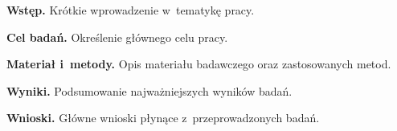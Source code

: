 
\textbf{Wstęp.}
Krótkie wprowadzenie w~tematykę pracy.

\textbf{Cel badań.}
Określenie głównego celu pracy.

\textbf{Materiał i~metody.}
Opis materiału badawczego oraz zastosowanych metod.

\textbf{Wyniki.}
Podsumowanie najważniejszych wyników badań.

\textbf{Wnioski.}
Główne wnioski płynące z~przeprowadzonych badań.
